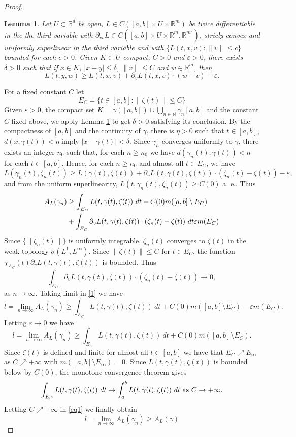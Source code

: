 \documentclass[12pt]{amsart}
\theoremstyle{plain}
\newtheorem{lemma}{Lemma}
\theoremstyle{definition}
\newcommand{\N}{\mathbb N}
\newcommand{\R}{\mathbb R}
\newcommand{\ep}{\varepsilon}
\newcommand{\ga}{\gamma}
\newcommand{\de}{\delta}
\newcommand{\entre}{\setminus}
\begin{document}
\begin{proof}
   \begin{lemma}\label{LemCle}
     Let $U\subset\R^d$ be open, $L\in C([a,b]\times U\times\R^m)$ be
     twice differentiable in the the third variable with
     $\partial_{vv}L\in C([a,b]\times U\times\R^m,\R^{m^2})$, stricly convex
       and uniformly superlinear in the third variable and with
$\{L(t,x,v):\|v\|\le c\}$ bounded for each $c>0$.
     Given $K\subset U$ compact, $C>0$ and $\ep>0$, there exists $\de>0$
  such that if $x\in K$, $| x-y|\le\de$, $\|v\|\le C$ and $w\in\R^m$,
  then
  \[  L(t,y,w)\ge L(t,x,v)+\partial_v L(t,x,v)\cdot(w-v) -\ep.\]
  \end{lemma}
  For a fixed constant $C$ let
   \[E_C=\{t\in[a,b]:\|\zeta(t)\|\le C\}  \]
  Given $\ep> 0$, the compact set $K=\ga([a, b])\cup\bigcup_{n\in\N} \ga_n[a, b]$ 
and the  constant $C$ fixed above, we apply Lemma \ref{LemCle} to get $\de >0$
  satisfying its conclusion. By the compactness of $[a,b]$ and the
  continuity of $\ga$, 
  there is $\eta>0$ such that  $t\in[a,b]$, $d(x,\ga(t)) < \eta$
  imply $|x-\ga(t)| < \de.$
 Since  $\ga_n$ converges uniformly to $\ga$,
  there exists an integer $n_0$ such that, for each $n\ge n_0$
  we have $d(\ga_n(t),\ga(t)) < \eta$ for each $t\in[a, b]$.
Hence, for each $n\ge n_0$ and almost all $t \in E_C$, we have
  \[L (\ga_n(t),\zeta_n(t))\ge L (\ga(t), \zeta(t)) +
    \partial_v L(t,\ga(t), \zeta(t))\cdot(\zeta_n(t) -\zeta(t))-\ep,\]
 and from the uniform superlinearity, $L(t,\ga_n(t), \zeta_n(t))\ge C(0)$
 a. e.. Thus
  \begin{align}\nonumber
    A_L(\ga_n)&\ge \int_{E_C}L(t,\ga(t), \zeta(t))\ dt
                       +C(0)m([a,b]\entre E_C)\\
& +\int_{E_C}\partial_vL(t,\ga(t), \zeta(t))\cdot (\zeta_n(t) -\zeta(t))\ dt
\-\ep m(E_C) \label{1}
  \end{align}
  Since $\{\|\zeta_n(t)\|\}$ is uniformly integrable, $\zeta_n(t)$ converges to
  $\zeta(t)$ in the weak topology $\sigma(L^1,L^\infty)$.
Since $\|\zeta(t)\|\le C$ for $t\in E_C$, the function $\chi_{E_C}(t)\partial_vL(t,\ga(t), \zeta(t))$
is bounded. Thus
\[\int_{E_C}\partial_v L(t,\ga(t), \zeta(t))\cdot (\zeta_n(t) -\zeta(t))\to 0,\]
as $n\to\infty$. Taking limit in \eqref{1} we have
\[l=\lim_{n\to\infty}A_L(\ga_n)\ge \int_{E_C}L(t,\ga(t), \zeta(t))\ dt
  +C(0) m([a,b]\entre E_C)-\ep m(E_C).\]
Letting $\ep\to 0$ we have
\begin{equation}
  \label{eq1}
  l=\lim_{n\to\infty}A_L(\ga_n)\ge \int_{E_C}L(t,\ga(t), \zeta(t))\ dt
  +C(0) m([a,b]\entre E_C).
\end{equation}
Since $\zeta(t)$ is defined and finite for almost all $t\in[a,b]$ we
have that $E_C\nearrow E_\infty$ as $C\nearrow +\infty$ with
$m([a,b]\entre E_\infty)=0$. Since $L(t,\ga(t), \zeta(t))$ is bounded below by $C(0)$,
the monotone convergence theorem gives
\[\int_{E_C}L(t,\ga(t), \zeta(t))\ dt\to\int_a^bL(t,\ga(t), \zeta(t))\ dt \hbox{ as }C\to+\infty.\]
Letting $C\nearrow+\infty$ in \eqref{eq1} we finally obtain
\[l=\lim_{n\to\infty}A_L(\ga_n) \ge A_L(\ga)\]
\end{proof}
\end{document}

